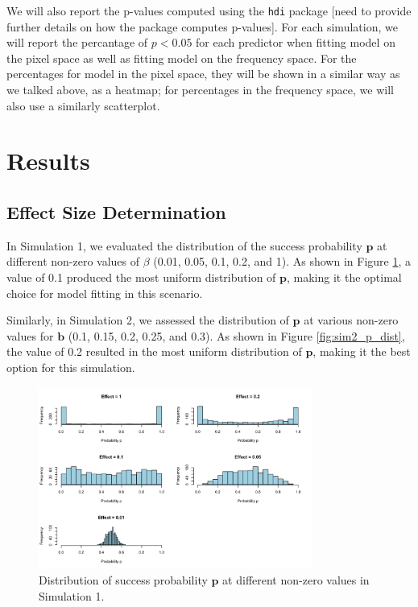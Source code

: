 \documentclass[12pt]{article}
\begin{document}
We will also report the p-values computed using the \texttt{hdi} package [need to provide further details on how the package computes p-values]. For each simulation, we will report the percantage of \( p<0.05 \) for each predictor when fitting model on the pixel space as well as fitting model on the frequency space. For the percentages for model in the pixel space, they will be shown in a similar way as we talked above, as a heatmap; for percentages in the frequency space, we will also use a similarly scatterplot.





\section{Results}

\subsection{Effect Size Determination}

In Simulation 1, we evaluated the distribution of the success probability \( \mathbf{p} \) at different non-zero values of \( \beta \) (0.01, 0.05, 0.1, 0.2, and 1). As shown in Figure \ref{fig:sim1_p_dist}, a value of 0.1 produced the most uniform distribution of \( \mathbf{p} \), making it the optimal choice for model fitting in this scenario.

Similarly, in Simulation 2, we assessed the distribution of \( \mathbf{p} \) at various non-zero values for \( \mathbf{b} \) (0.1, 0.15, 0.2, 0.25, and 0.3). As shown in Figure \ref{fig:sim2_p_dist}, the value of 0.2 resulted in the most uniform distribution of \( \mathbf{p} \), making it the best option for this simulation.

\begin{figure}[h!]
	\centering
	\includegraphics[width=0.8\textwidth]{sim1_p_dist.png}
  \caption{Distribution of success probability \( \mathbf{p} \) at different non-zero values in Simulation 1.}
	\label{fig:sim1_p_dist}
\end{figure}
\end{document}
